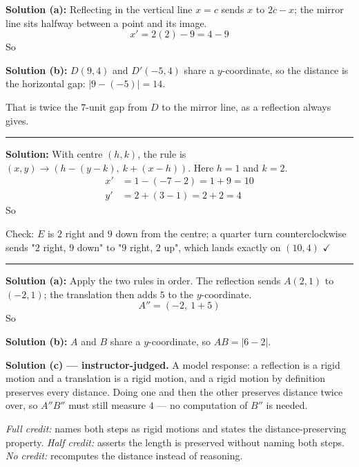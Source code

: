 \documentclass[12pt]{article}
\begin{document}

\textbf{Solution (a):} Reflecting in the vertical line $x = c$ sends $x$ to $2c - x$; the mirror line sits halfway between a point and its image.
\[ x' = 2(2) - 9 = 4 - 9 \]
So 

\textbf{Solution (b):} $D(9, 4)$ and $D'(-5, 4)$ share a $y$-coordinate, so the distance is the horizontal gap: $|9 - (-5)| = 14$. 

That is twice the $7$-unit gap from $D$ to the mirror line, as a reflection always gives.

\vspace{0.2cm}\noindent\rule{\linewidth}{0.2pt}


\textbf{Solution:} With centre $(h, k)$, the rule is $(x, y) \to (h - (y - k),\ k + (x - h))$. Here $h = 1$ and $k = 2$.
\begin{align*}
  x' &= 1 - (-7 - 2) = 1 + 9 = 10 \\
  y' &= 2 + (3 - 1) = 2 + 2 = 4
\end{align*}
So 

Check: $E$ is $2$ right and $9$ down from the centre; a quarter turn counterclockwise sends "$2$ right, $9$ down" to "$9$ right, $2$ up", which lands exactly on $(10, 4)$ $\checkmark$

\vspace{0.2cm}\noindent\rule{\linewidth}{0.2pt}


\textbf{Solution (a):} Apply the two rules in order. The reflection sends $A(2, 1)$ to $(-2, 1)$; the translation then adds $5$ to the $y$-coordinate.
\[ A'' = (-2,\ 1 + 5) \]
So 

\textbf{Solution (b):} $A$ and $B$ share a $y$-coordinate, so $AB = |6 - 2|$. 

\textbf{Solution (c) --- instructor-judged.} A model response: a reflection is a rigid motion and a translation is a rigid motion, and a rigid motion by definition preserves every distance. Doing one and then the other preserves distance twice over, so $A''B''$ must still measure $4$ --- no computation of $B''$ is needed.

\emph{Full credit:} names both steps as rigid motions and states the distance-preserving property. \emph{Half credit:} asserts the length is preserved without naming both steps. \emph{No credit:} recomputes the distance instead of reasoning.
\end{document}
